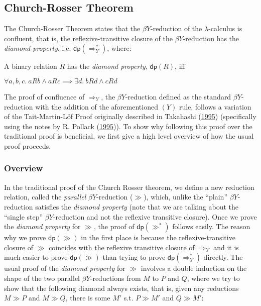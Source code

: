 \documentclass[a4paper, 12pt, twoside]{style/ociamthesis}
\theoremstyle{plain}
\theoremstyle{definition}
\newtheorem{Definition}{Definition}[chapter]
\theoremstyle{remark}
\newcommand{\red}{\Rightarrow_Y}
\newcommand{\dip}{\textsf{dp}}
\renewenvironment{Definition}{\begin{OldDefinition}\begin{mdframed}[style=example, linecolor=cyan]}{\end{mdframed}\end{OldDefinition}}
\begin{document}
\subsection{Church-Rosser Theorem}\label{church-rosser-theorem}

\label{cr-def}

The Church-Rosser Theorem states that the \(\beta Y\)-reduction of the
\(\lambda\)-calculus is confluent, that is, the reflexive-transitive
closure of the \(\beta Y\)-reduction has the \emph{diamond property},
i.e. \(\dip(\red^*)\), where:

\begin{Definition}[$\dip(R)$]

A binary relation \(R\) has the \emph{diamond property}, \(\dip(R)\),
iff

\begin{center}
$\forall a, b, c.\ aRb \land aRc \implies \exists d.\ bRd \land cRd$
\end{center}

\end{Definition}

The proof of confluence of \(\red\), the \(\beta Y\)-reduction defined
as the standard \(\beta Y\)-reduction with the addition of the
aforementioned \((Y)\) rule, follows a variation of the Tait-Martin-Löf
Proof originally described in Takahashi
(\protect\hyperlink{ref-takahashi95}{1995}) (specifically using the
notes by R. Pollack (\protect\hyperlink{ref-pollack95}{1995})). To show
why following this proof over the traditional proof is beneficial, we
first give a high level overview of how the usual proof proceeds.

\subsubsection{Overview}\label{overview}

In the traditional proof of the Church Rosser theorem, we define a new
reduction relation, called the \emph{parallel} \(\beta Y\)-reduction
(\(\gg\)), which, unlike the ``plain'' \(\beta Y\)-reduction satisfies
the \emph{diamond property} (note that we are talking about the ``single
step'' \(\beta Y\)-reduction and not the reflexive transitive closure).
Once we prove the \emph{diamond property} for \(\gg\), the proof of
\(\dip(\gg^*)\) follows easily. The reason why we prove \(\dip(\gg)\) in
the first place is because the reflexive-transitive closure of \(\gg\)
coincides with the reflexive transitive closure of \(\red\) and it is
much easier to prove \(\dip(\gg)\) than trying to prove \(\dip(\red^*)\)
directly. The usual proof of the \emph{diamond property} for \(\gg\)
involves a double induction on the shape of the two parallel
\(\beta Y\)-reductions from \(M\) to \(P\) and \(Q\), where we try to
show that the following diamond always exists, that is, given any
reductions \(M \gg P\) and \(M \gg Q\), there is some \(M'\) s.t.
\(P \gg M'\) and \(Q \gg M'\):
\end{document}
